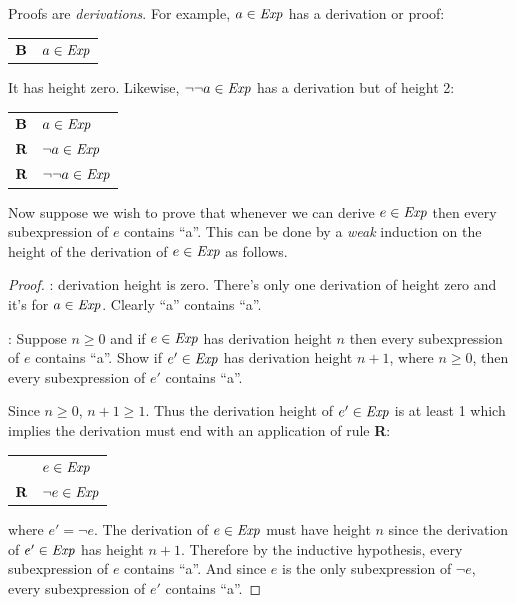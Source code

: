 \documentclass[12pt]{article}
\newcommand{\id}[1]{\mbox{\it #1\/}}
\newcommand{\bid}[1]{\mbox{\bf #1}}
\begin{document}
Proofs are {\em derivations\/}.
For example, $a\in\id{Exp}$ has a derivation or proof:
\begin{center}
\begin{tabular}{ll}
$\bid{B}$ & $a\in\id{Exp}$
\end{tabular}
\end{center}
It has height zero.  Likewise, $\neg\neg a\in\id{Exp}$ has a derivation but of height 2:
\begin{center}
\begin{tabular}{ll}
$\bid{B}$ & $a\in\id{Exp}$ \\ \cline{2-2}
$\bid{R}$ & $\neg a\in\id{Exp}$ \\ \cline{2-2}
$\bid{R}$ & $\neg\neg a\in\id{Exp}$ 
\end{tabular}
\end{center}

Now suppose we wish to prove that whenever we can derive $e\in\id{Exp}$ then
every subexpression of $e$ contains ``a''.
This can be done by a {\em weak\/} induction on the height of the derivation of $e\in\id{Exp}$
as follows.

\begin{proof}
:
derivation height is zero.
There's only one derivation of height zero and it's for $a\in\id{Exp}$.  
Clearly ``a'' contains ``a''.

:
Suppose $n\geq 0$ and if $e\in\id{Exp}$ has derivation height $n$ then every
subexpression of $e$ contains ``a''.
Show if $e'\in\id{Exp}$ has derivation height $n+1$, where $n\geq 0$,
then every subexpression of $e'$ contains ``a''.

Since $n\geq 0$, $n+1\geq 1$.
Thus the derivation height of $e'\in\id{Exp}$ is at least 1 which implies the derivation must end
with an application of rule {\bf R}:
\begin{center}
\begin{tabular}{ll}
 & $e\in\id{Exp}$ \\ \cline{2-2}
$\bid{R}$ & $\neg e\in\id{Exp}$ 
\end{tabular}
\end{center}
where $e' = \neg e$.
The derivation of $e\in\id{Exp}$ must have height $n$ since the derivation of $e'\in\id{Exp}$ has height $n+1$.
Therefore by the inductive hypothesis, every subexpression of $e$ contains ``a''.
And since $e$ is the only subexpression of $\neg e$, every subexpression of $e'$ contains ``a''.
\end{proof}
\end{document}
